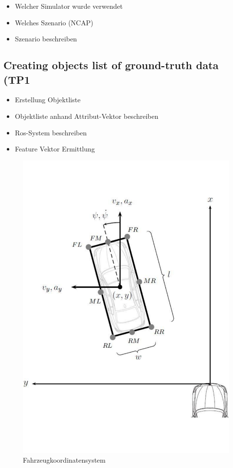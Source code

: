 \documentclass[letterpaper, 10 pt, conference]{ieeeconf}  %
\begin{document}
\begin{itemize}
\item Welcher Simulator wurde verwendet
\item Welches Szenario (NCAP)
\item Szenario beschreiben
\end{itemize}


   
\subsection{Creating objects list of ground-truth data (TP1}

\begin{itemize}
\item Erstellung Objektliste
\item Objektliste anhand Attribut-Vektor beschreiben
\item Ros-System beschreiben
\item Feature Vektor Ermittlung
\end{itemize}

   \begin{figure}[thpb]
      \centering
       \includegraphics[scale=0.3]{KoordinatenSystem}
      \caption{Fahrzeugkoordinatensystem}
      \label{figurelabel}
   \end{figure}
\end{document}
